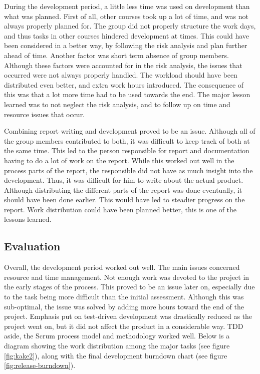 During the development period, a little less time was used on development than what was planned. First of all, other courses took up a lot of time, and was not always properly planned for. The group did not properly structure the work days, and thus tasks in other courses hindered development at times. This could have been considered in a better way, by following the risk analysis and plan further ahead of time. Another factor was short term absence of group members. Although these factors were accounted for in the risk analysis, the issues that occurred were not always properly handled. The workload should have been distributed even better, and extra work hours introduced. The consequence of this was that a lot more time had to be used towards the end. The major lesson learned was to not neglect the risk analysis, and to follow up on time and resource issues that occur.

Combining report writing and development proved to be an issue. Although all of the group members contributed to both, it was difficult to keep track of both at the same time. This led to the person responsible for report and documentation having to do a lot of work on the report. While this worked out well in the process parts of the report, the responsible did not have as much insight into the development. Thus, it was difficult for him to write about the actual product. Although distributing the different parts of the report was done eventually, it should have been done earlier. This would have led to steadier progress on the report. Work distribution could have been planned better, this is one of the lessons learned.

\subsection{Evaluation}
\label{subsec:project_evaluation-development-evaluation}

Overall, the development period worked out well. The main issues concerned resource and time management. Not enough work was devoted to the project in the early stages of the process. This proved to be an issue later on, especially due to the task being more difficult than the initial assessment. Although this was sub-optimal, the issue was solved by adding more hours toward the end of the project. Emphasis put on test-driven development was drastically reduced as the project went on, but it did not affect the product in a considerable way. TDD aside, the Scrum process model and methodology worked well. Below is a diagram showing the work distribution among the major tasks (see figure \ref{fig:kake2}), along with the final development burndown chart (see figure \ref{fig:release-burndown}).

